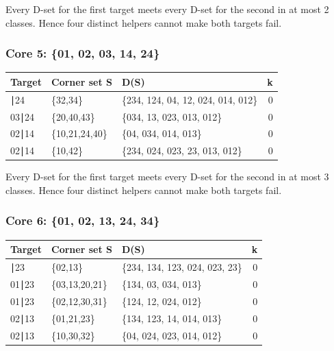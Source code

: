 \documentclass[
  10pt,
]{article}
\begin{document}
Every D-set for the first target meets every D-set for the second in at
most 2 classes. Hence four distinct helpers cannot make both targets
fail.

\hypertarget{core-5-01-02-03-14-24}{%
\subsubsection*{Core 5: \{01, 02, 03, 14,
24\}}\label{core-5-01-02-03-14-24}}

\begin{longtable}[]{@{}lllr@{}}
\toprule\noalign{}
Target & Corner set S & D(S) & k \\
\midrule\noalign{}
\endhead
\bottomrule\noalign{}
\endlastfoot
03∣24 & \{32,34\} & \{234, 124, 04, 12, 024, 014, 012\} & 0 \\
03∣24 & \{20,40,43\} & \{034, 13, 023, 013, 012\} & 0 \\
02∣14 & \{10,21,24,40\} & \{04, 034, 014, 013\} & 0 \\
02∣14 & \{10,42\} & \{234, 024, 023, 23, 013, 012\} & 0 \\
\end{longtable}

Every D-set for the first target meets every D-set for the second in at
most 3 classes. Hence four distinct helpers cannot make both targets
fail.

\hypertarget{core-6-01-02-13-24-34}{%
\subsubsection*{Core 6: \{01, 02, 13, 24,
34\}}\label{core-6-01-02-13-24-34}}

\begin{longtable}[]{@{}lllr@{}}
\toprule\noalign{}
Target & Corner set S & D(S) & k \\
\midrule\noalign{}
\endhead
\bottomrule\noalign{}
\endlastfoot
01∣23 & \{02,13\} & \{234, 134, 123, 024, 023, 23\} & 0 \\
01∣23 & \{03,13,20,21\} & \{134, 03, 034, 013\} & 0 \\
01∣23 & \{02,12,30,31\} & \{124, 12, 024, 012\} & 0 \\
02∣13 & \{01,21,23\} & \{134, 123, 14, 014, 013\} & 0 \\
02∣13 & \{10,30,32\} & \{04, 024, 023, 014, 012\} & 0 \\
\end{longtable}
\end{document}
